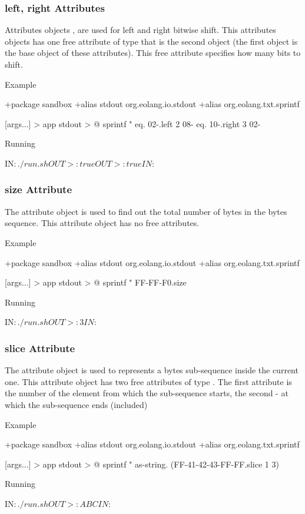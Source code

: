 \documentclass[12pt]{book}
\begin{document}
\subsubsection{left, right Attributes}
Attributes objects ,  are used for left and right bitwise shift. This attributes objects has one free attribute of type  that is the second object (the first object is the base object of these attributes). This free attribute specifies how many bits to shift.

Example
\begin{ffcode}
+package sandbox
+alias stdout org.eolang.io.stdout
+alias org.eolang.txt.sprintf

[args...] > app
  stdout > @
    sprintf
      "%
      eq.
        02-.left 2
        08-
      eq.
        10-.right 3
        02-
    
Running
    
IN$: ./run.sh
OUT>: true
OUT>: true
IN$: 
\end{ffcode}

\subsubsection{size Attribute}
The  attribute object is used to find out the total number of bytes in the bytes sequence. This attribute object has no free attributes.

Example
\begin{ffcode}
+package sandbox
+alias stdout org.eolang.io.stdout
+alias org.eolang.txt.sprintf

[args...] > app
  stdout > @
    sprintf
      "%
      FF-FF-F0.size
    
Running

IN$: ./run.sh
OUT>: 3
IN$: 
\end{ffcode}

\subsubsection{slice Attribute}
The  attribute object is used to represents a bytes sub-sequence inside the current one. This attribute object has two free attributes of type . The first attribute is the number of the element from which the sub-sequence starts, the second - at which the sub-sequence ends (included)

Example
\begin{ffcode}
+package sandbox
+alias stdout org.eolang.io.stdout
+alias org.eolang.txt.sprintf

[args...] > app
  stdout > @
    sprintf
      "%
      as-string.
        (FF-41-42-43-FF-FF.slice 1 3)
    
Running

IN$: ./run.sh
OUT>: ABC
IN$: 
\end{ffcode}
\end{document}
